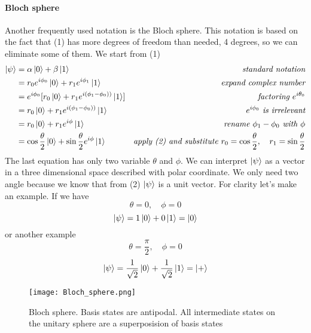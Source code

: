 \documentclass[main.tex]{subfiles}
\begin{document}
		\paragraph{Bloch sphere}
		Another frequently used notation is the Bloch sphere. This notation is based on the fact that (1) has more degrees of 
		freedom than needed, 4 degrees, so we can eliminate some of them. We start from (1)
		\begin{align*}
		\ket{\psi} 
		& =\alpha\ket{0}+\beta\ket{1} 
		& \quad\textit{standard notation}\\
        & =r_0e^{i\phi_0}\ket{0}+r_1e^{i\phi_1}\ket{1} 
        & \quad\textit{expand complex number}\\
        & =e^{i\phi_0}[r_0\ket{0}+r_1e^{i(\phi_1-\phi_0))}\ket{1}]      
        & \quad\textit{factoring }e^{i\theta_0}\\
        & =r_0\ket{0}+r_1e^{i(\phi_1-\phi_0))}\ket{1}     
        & \quad e^{i\phi_0}\textit{ is irrelevant}\\
        & =r_0\ket{0}+r_1e^{i\phi}\ket{1}    
        & \quad\textit{rename }\phi_1-\phi_0\textit{ with }\phi\\
        & =\cos{\frac{\theta}{2}}\ket{0}+\sin{\frac{\theta}{2}}e^{i\phi}\ket{1}
        & \textit{apply (2) and substitute }r_0=\cos{\frac{\theta}{2}},\quad r_1=\sin{\frac{\theta}{2}}\\
        \end{align*}
		The last equation has only two variable $\theta$ and $\phi$. We can interpret $\ket{\psi}$ as a vector in a three
		dimensional space described with polar coordinate. We only need two angle because we know that from (2) $\ket{\psi}$ 
		is a unit vector. For clarity let's make an example. If we have 
		$$\theta=0, \quad \phi=0$$
		$$\ket{\psi} = 1 \ket{0} + 0 \ket{1} = \ket{0}$$
		or another example
		$$\theta=\frac{\pi}{2}, \quad \phi=0$$
		$$\ket{\psi} = \frac{1}{\sqrt{2}} \ket{0} + \frac{1}{\sqrt{2}} \ket{1} = \ket{+}$$
		
		\begin{figure}
		\begin{center}
			\texttt{[image: Bloch\_sphere.png]}
			\caption{Bloch sphere. Basis states are antipodal. All intermediate states on the unitary sphere are a superposision of 
			basis states}
		\end{center}
		\end{figure}
		
\end{document}

